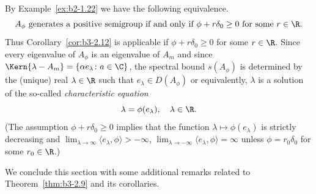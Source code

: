 \begin{example}
\begin{enumerate}[\upshape (i), wide, labelindent=.25em]
By Example~\ref{ex:b2-1.22} we have the following equivalence.
\begin{equation}\label{eq:b3-2.29}
	A_{\phi} \text{ generates a positive semigroup if and only if } \phi + r\delta_{0} \geq 0 \text{ for some } r \in \R.
\end{equation}
Thus Corollary~\ref{cor:b3-2.12} is applicable if\/ $\phi + r\delta_{0} \geq 0$ for some $r \in \R$.
Since every eigenvalue of\/ $A_{\phi}$ is an eigenvalue of\/ $A_{m}$ and since $\Kern{\lambda-A_{m}} = \{\alpha e_{\lambda} \colon a \in \C\}$, the spectral bound $s(A_{\phi})$ is determined by the (unique) real $\lambda \in \R$ such that $e_{\lambda} \in D(A_{\phi})$ or equivalently, $\lambda$ is a solution of the so-called \emph{characteristic equation}
\begin{equation}\label{eq:b3-2.30}
	\lambda = \phi(e_{\lambda}), \quad \lambda \in \R.
\end{equation}
(The assumption $\phi + r\delta_{0} \geq 0$ implies that the function $\lambda \mapsto \phi(e_{\lambda})$ is strictly decreasing and $\lim_{\lambda \to \infty}\langle e_{\lambda},\phi \rangle > -\infty$, $\lim_{\lambda \to -\infty}\langle e_{\lambda},\phi \rangle = \infty$ unless $\phi = r_{0}\delta_{0}$ for some $r_{0} \in \R$.)
\end{enumerate}
\end{example}
We conclude this section with some additional remarks related to Theorem~\ref{thm:b3-2.9} and its corollaries.
